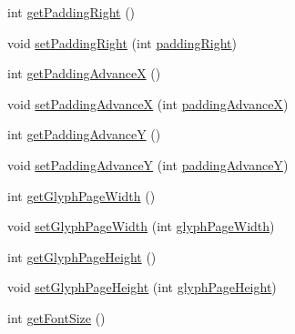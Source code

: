 \begin{DoxyCompactItemize}
\item 
int \mbox{\hyperlink{classorg_1_1newdawn_1_1slick_1_1font_1_1_hiero_settings_aa71e66368d07c079140249ffba5ceaee}{get\+Padding\+Right}} ()
\item 
void \mbox{\hyperlink{classorg_1_1newdawn_1_1slick_1_1font_1_1_hiero_settings_a2ecc3b11c381bbe15c7693f7757c9adf}{set\+Padding\+Right}} (int \mbox{\hyperlink{classorg_1_1newdawn_1_1slick_1_1font_1_1_hiero_settings_aca6e7bc5fddecfc1fe6fc94e864f05bc}{padding\+Right}})
\item 
int \mbox{\hyperlink{classorg_1_1newdawn_1_1slick_1_1font_1_1_hiero_settings_ab0b5d7099becb372761cdbcfb85f4fa5}{get\+Padding\+AdvanceX}} ()
\item 
void \mbox{\hyperlink{classorg_1_1newdawn_1_1slick_1_1font_1_1_hiero_settings_a8774b78349709339a9a7f3e28164d7ae}{set\+Padding\+AdvanceX}} (int \mbox{\hyperlink{classorg_1_1newdawn_1_1slick_1_1font_1_1_hiero_settings_a95bbfc376e37c8cbddb33d7e2fed2dd4}{padding\+AdvanceX}})
\item 
int \mbox{\hyperlink{classorg_1_1newdawn_1_1slick_1_1font_1_1_hiero_settings_a09bf22aad17ea9829852c8244798f023}{get\+Padding\+AdvanceY}} ()
\item 
void \mbox{\hyperlink{classorg_1_1newdawn_1_1slick_1_1font_1_1_hiero_settings_a1085a06813f620e65cd29c3ecf9893d5}{set\+Padding\+AdvanceY}} (int \mbox{\hyperlink{classorg_1_1newdawn_1_1slick_1_1font_1_1_hiero_settings_a9ebcbca5bb87465cbb18bbc40b1bb09e}{padding\+AdvanceY}})
\item 
int \mbox{\hyperlink{classorg_1_1newdawn_1_1slick_1_1font_1_1_hiero_settings_a28f6fc8a6876f1185489089e7a9f1184}{get\+Glyph\+Page\+Width}} ()
\item 
void \mbox{\hyperlink{classorg_1_1newdawn_1_1slick_1_1font_1_1_hiero_settings_aedb1b75ca8b2af6ec520b0779fd9fbe9}{set\+Glyph\+Page\+Width}} (int \mbox{\hyperlink{classorg_1_1newdawn_1_1slick_1_1font_1_1_hiero_settings_aeed4e1a4668cfa3c3dc94d481f68a5c3}{glyph\+Page\+Width}})
\item 
int \mbox{\hyperlink{classorg_1_1newdawn_1_1slick_1_1font_1_1_hiero_settings_a41c99f97588e31a72fc295351c9bece0}{get\+Glyph\+Page\+Height}} ()
\item 
void \mbox{\hyperlink{classorg_1_1newdawn_1_1slick_1_1font_1_1_hiero_settings_a4135332c3ad3745b61e59f725a44f87c}{set\+Glyph\+Page\+Height}} (int \mbox{\hyperlink{classorg_1_1newdawn_1_1slick_1_1font_1_1_hiero_settings_a17c4e911610ef26561713830e4998cc1}{glyph\+Page\+Height}})
\item 
int \mbox{\hyperlink{classorg_1_1newdawn_1_1slick_1_1font_1_1_hiero_settings_a9a381d73a8b2d4f2427dbadecf972f65}{get\+Font\+Size}} ()

\end{DoxyCompactItemize}
